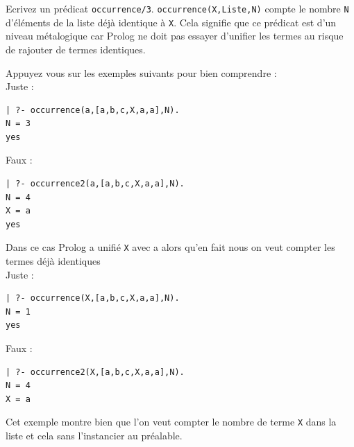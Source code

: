 \documentclass[a4paper]{article}
\newenvironment{CAnswer}{\color{red}\begin{Answer}}
                        {\end{Answer}}
\begin{document}
\begin{Exercise}[title={nombre d'occurrences d'un terme}]
Ecrivez un prédicat \verb#occurrence/3#. \verb#occurrence(X,Liste,N)# compte
le nombre \verb#N# d'éléments de la liste déjà identique à \verb#X#. Cela
signifie que ce prédicat est d'un niveau métalogique car Prolog ne doit pas
essayer d'unifier les termes au risque de rajouter de termes identiques.

Appuyez vous sur les exemples suivants pour bien comprendre :\\
Juste :
\begin{verbatim}
| ?- occurrence(a,[a,b,c,X,a,a],N). 
N = 3 
yes 
\end{verbatim}
Faux :
\begin{verbatim}
| ?- occurrence2(a,[a,b,c,X,a,a],N). 
N = 4 
X = a 
yes 
\end{verbatim}

Dans ce cas Prolog a unifié \verb#X# avec a alors qu'en fait nous on veut
compter les termes déjà identiques\\
Juste :
\begin{verbatim}
| ?- occurrence(X,[a,b,c,X,a,a],N). 
N = 1 
yes 
\end{verbatim}
Faux : 
\begin{verbatim}
| ?- occurrence2(X,[a,b,c,X,a,a],N). 
N = 4 
X = a 
\end{verbatim}
Cet exemple montre bien que l'on veut compter le nombre de terme \verb#X# dans
la liste et cela sans l'instancier au préalable.
\end{Exercise}
\begin{CAnswer}

\end{CAnswer}
\end{document}

